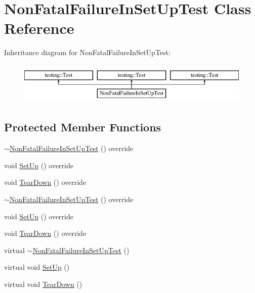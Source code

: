 \hypertarget{class_non_fatal_failure_in_set_up_test}{}\section{Non\+Fatal\+Failure\+In\+Set\+Up\+Test Class Reference}
\label{class_non_fatal_failure_in_set_up_test}
Inheritance diagram for Non\+Fatal\+Failure\+In\+Set\+Up\+Test\+:\begin{figure}[H]
\begin{center}
\leavevmode
\includegraphics[height=2.000000cm]{d3/d76/class_non_fatal_failure_in_set_up_test}
\end{center}
\end{figure}
\subsection*{Protected Member Functions}
\begin{DoxyCompactItemize}
\item 
\mbox{\hyperlink{class_non_fatal_failure_in_set_up_test_a005ae391cd3113deed2e7eb6ccb20590}{$\sim$\+Non\+Fatal\+Failure\+In\+Set\+Up\+Test}} () override
\item 
void \mbox{\hyperlink{class_non_fatal_failure_in_set_up_test_ae8a49eec423dff7ef00e4d27cd9e39fa}{Set\+Up}} () override
\item 
void \mbox{\hyperlink{class_non_fatal_failure_in_set_up_test_a564b41b4e07d4e9c6921d1f2e1be9352}{Tear\+Down}} () override
\item 
\mbox{\hyperlink{class_non_fatal_failure_in_set_up_test_a005ae391cd3113deed2e7eb6ccb20590}{$\sim$\+Non\+Fatal\+Failure\+In\+Set\+Up\+Test}} () override
\item 
void \mbox{\hyperlink{class_non_fatal_failure_in_set_up_test_ae8a49eec423dff7ef00e4d27cd9e39fa}{Set\+Up}} () override
\item 
void \mbox{\hyperlink{class_non_fatal_failure_in_set_up_test_a564b41b4e07d4e9c6921d1f2e1be9352}{Tear\+Down}} () override
\item 
virtual \mbox{\hyperlink{class_non_fatal_failure_in_set_up_test_ae4b4ee1812e3427cf82b155256547442}{$\sim$\+Non\+Fatal\+Failure\+In\+Set\+Up\+Test}} ()
\item 
virtual void \mbox{\hyperlink{class_non_fatal_failure_in_set_up_test_ae24c724bae1fcd2601f58fa9c26adca3}{Set\+Up}} ()
\item 
virtual void \mbox{\hyperlink{class_non_fatal_failure_in_set_up_test_a36abc808b11afc6a9bfa20dac5c28c30}{Tear\+Down}} ()
\end{DoxyCompactItemize}

